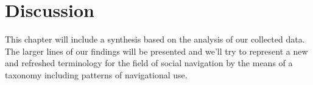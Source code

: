 \chapter{Discussion}
\label{chapter:discussion}

This chapter will include a synthesis based on the analysis of our collected
data. The larger lines of our findings will be presented and we'll try to
represent a new and refreshed terminology for the field of social navigation
by the means of a taxonomy including patterns of navigational use.
